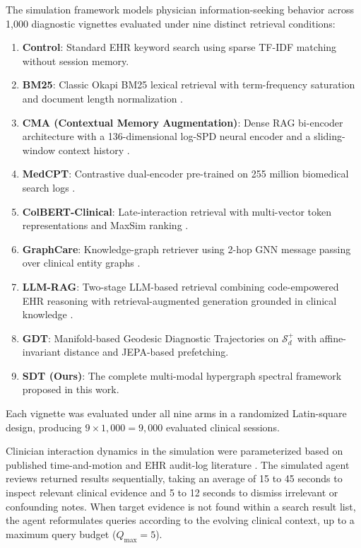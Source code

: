 \documentclass[10pt, onecolumn]{article}
\begin{document}
The simulation framework models physician information-seeking behavior across 1{,}000 diagnostic vignettes evaluated under nine distinct retrieval conditions:
\begin{enumerate}[(1)]
  \item \textbf{Control}: Standard EHR keyword search using sparse TF-IDF matching without session memory.
  \item \textbf{BM25}: Classic Okapi BM25 lexical retrieval with term-frequency saturation and document length normalization \cite{baeza1999modern}.
  \item \textbf{CMA (Contextual Memory Augmentation)}: Dense RAG bi-encoder architecture with a 136-dimensional log-SPD neural encoder and a sliding-window context history \cite{lewis2020retrieval}.
  \item \textbf{MedCPT}: Contrastive dual-encoder pre-trained on 255 million biomedical search logs \cite{jin2023medcpt}.
  \item \textbf{ColBERT-Clinical}: Late-interaction retrieval with multi-vector token representations and MaxSim ranking \cite{santhanam2022colbertv2}.
  \item \textbf{GraphCare}: Knowledge-graph retriever using 2-hop GNN message passing over clinical entity graphs \cite{jiang2024graphcare}.
  \item \textbf{LLM-RAG}: Two-stage LLM-based retrieval combining code-empowered EHR reasoning \cite{eickhoff2024ehrrag} with retrieval-augmented generation grounded in clinical knowledge \cite{zakka2024almanac}.
  \item \textbf{GDT}: Manifold-based Geodesic Diagnostic Trajectories on $\mathcal{S}_d^+$ with affine-invariant distance and JEPA-based prefetching.
  \item \textbf{SDT (Ours)}: The complete multi-modal hypergraph spectral framework proposed in this work.
\end{enumerate}
Each vignette was evaluated under all nine arms in a randomized Latin-square design, producing $9 \times 1{,}000 = 9{,}000$ evaluated clinical sessions.

Clinician interaction dynamics in the simulation were parameterized based on published time-and-motion and EHR audit-log literature \cite{sinsky2016allocation,zheng2021analyzing,harry2018cognitive}. The simulated agent reviews returned results sequentially, taking an average of 15 to 45 seconds to inspect relevant clinical evidence and 5 to 12 seconds to dismiss irrelevant or confounding notes. When target evidence is not found within a search result list, the agent reformulates queries according to the evolving clinical context, up to a maximum query budget ($Q_{\max} = 5$).
\end{document}
